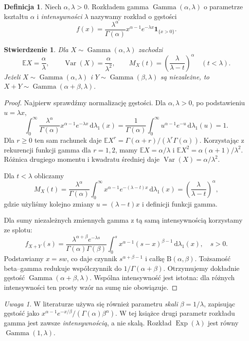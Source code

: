 \documentclass[11pt,a4paper,oneside]{report}
\numberwithin{equation}{chapter}
\theoremstyle{plain}
\newtheorem{stwierdzenie}[twierdzenie]{Stwierdzenie}
\theoremstyle{definition}
\newtheorem{definicja}{Definicja}[chapter]
\theoremstyle{remark}
\newtheorem{uwaga}{Uwaga}[chapter]
\newcommand{\E}{\mathbb{E}}
\newcommand{\Var}{\operatorname{Var}}
\newcommand{\ind}[1]{\mathbf{1}_{#1}}
\newcommand{\dd}{\mathrm{d}}
\newcommand{\Gam}{\operatorname{Gamma}}
\begin{document}
\begin{definicja}
Niech $\alpha,\lambda>0$. Rozkładem gamma $\Gam(\alpha,\lambda)$
o parametrze kształtu $\alpha$ i \emph{intensywności} $\lambda$
nazywamy rozkład o gęstości
\begin{equation}\label{eq:gamma}
f(x)=\frac{\lambda^\alpha}{\Gamma(\alpha)}
 x^{\alpha-1}e^{-\lambda x}\ind{\{x>0\}}.
\end{equation}
\end{definicja}

\begin{stwierdzenie}
Dla $X\sim\Gam(\alpha,\lambda)$ zachodzi
\[
\E X=\frac\alpha\lambda,\qquad
\Var(X)=\frac\alpha{\lambda^2},\qquad
M_X(t)=\left(\frac\lambda{\lambda-t}\right)^\alpha\quad(t<\lambda).
\]
Jeżeli $X\sim\Gam(\alpha,\lambda)$ i
$Y\sim\Gam(\beta,\lambda)$ są niezależne, to
$X+Y\sim\Gam(\alpha+\beta,\lambda)$.
\end{stwierdzenie}
\begin{proof}
Najpierw sprawdźmy normalizację gęstości. Dla
$\alpha,\lambda>0$, po podstawieniu $u=\lambda x$,
\[
\int_0^\infty\frac{\lambda^\alpha}{\Gamma(\alpha)}
 x^{\alpha-1}e^{-\lambda x}\,\dd\lambda_1(x)
=\frac1{\Gamma(\alpha)}\int_0^\infty
u^{\alpha-1}e^{-u}\,\dd\lambda_1(u)=1.
\]
Dla $r\geq0$ ten sam rachunek daje
$\E X^r=\Gamma(\alpha+r)/(\lambda^r\Gamma(\alpha))$.
Korzystając z rekurencji funkcji gamma dla $r=1,2$,
mamy $\E X=\alpha/\lambda$ i
$\E X^2=\alpha(\alpha+1)/\lambda^2$.
Różnica drugiego momentu i kwadratu średniej daje
$\Var(X)=\alpha/\lambda^2$.

Dla $t<\lambda$ obliczamy
\[
M_X(t)=\frac{\lambda^\alpha}{\Gamma(\alpha)}
\int_0^\infty x^{\alpha-1}e^{-(\lambda-t)x}
\,\dd\lambda_1(x)
=\left(\frac{\lambda}{\lambda-t}\right)^\alpha,
\]
gdzie użyliśmy kolejno zmiany $u=(\lambda-t)x$
i definicji funkcji gamma.

Dla sumy niezależnych zmiennych gamma z tą samą
intensywnością korzystamy ze splotu:
\[
f_{X+Y}(s)=\frac{\lambda^{\alpha+\beta}e^{-\lambda s}}
{\Gamma(\alpha)\Gamma(\beta)}
\int_0^s x^{\alpha-1}(s-x)^{\beta-1}\,\dd\lambda_1(x),
\quad s>0.
\]
Podstawiamy $x=sw$, co daje czynnik
$s^{\alpha+\beta-1}$ i całkę $\mathrm B(\alpha,\beta)$.
Tożsamość beta--gamma redukuje współczynnik do
$1/\Gamma(\alpha+\beta)$. Otrzymujemy dokładnie
gęstość $\Gam(\alpha+\beta,\lambda)$.
Wspólna intensywność jest istotna: dla różnych
intensywności ten prosty wzór na sumę nie obowiązuje.
\end{proof}

\begin{uwaga}
W literaturze używa się również parametru \emph{skali}
$\beta=1/\lambda$, zapisując gęstość jako
$x^{\alpha-1}e^{-x/\beta}/(\Gamma(\alpha)\beta^\alpha)$.
W tej książce drugi parametr rozkładu gamma jest zawsze
\emph{intensywnością}, a nie skalą.
Rozkład $\operatorname{Exp}(\lambda)$ jest równy $\Gam(1,\lambda)$.
\end{uwaga}
\end{document}
